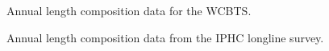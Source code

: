 \documentclass[
]{scrartcl}
\begin{document}
\begin{figure}


\caption{\label{fig-NWFSC_lencomps}Annual length composition data for
the WCBTS.}

\end{figure}%

\begin{figure}


\caption{\label{fig-IPHC_lencomps}Annual length composition data from
the IPHC longline survey.}

\end{figure}%
\end{document}
